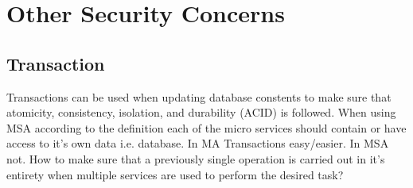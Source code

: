 \section{Other Security Concerns}
\subsection{Transaction}
\begin{sloppypar}
    Transactions can be used when updating database constents to make sure that
    atomicity, consistency, isolation, and durability (ACID) \citep{acid} is
    followed. When using MSA according to the definition each of the micro
    services should contain or have access to it's own data i.e. database. In MA
    Transactions easy/easier. In MSA not. How to make sure that a previously
    single operation is carried out in it's entirety when multiple services are
    used to perform the desired task?
\end{sloppypar}


